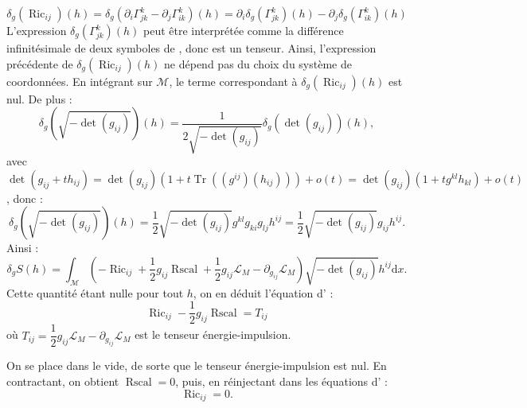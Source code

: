 \documentclass[12pt,a4paper]{article}
\DeclareMathOperator{\Tr}{Tr}
\DeclareMathOperator{\Ric}{Ric}
\DeclareMathOperator{\Rscal}{Rscal}
\theoremstyle{definition}
\begin{document}
$$
\delta_g\left(\Ric_{ij}\right)(h)=\delta_g\left(\partial_i\Gamma^k_{jk}-\partial_j\Gamma^k_{ik}\right)(h)=\partial_i\delta_g\left(\Gamma^k_{jk}\right)(h)-\partial_j\delta_g\left(\Gamma^k_{ik}\right)(h)
$$
L'expression $\delta_g\left(\Gamma_{jk}^k\right)(h)$ peut être interprétée comme la différence infinitésimale de deux symboles de , donc est un tenseur. Ainsi, l'expression précédente de $\delta_g\left(\Ric_{ij}\right)(h)$ ne dépend pas du choix du système de coordonnées.\newline
En intégrant sur $\mathcal{M}$, le terme correspondant à $\delta_g(\Ric_{ij})(h)$ est nul.
\newpage
De plus : 
$$
\delta_g\left(\sqrt{-\det(g_{ij})}\right)(h)=\dfrac{1}{2\sqrt{-\det(g_{ij})}}\delta_g\left(\det(g_{ij})\right)(h),
$$
avec $\det(g_{ij}+th_{ij})=\det(g_{ij})(1+t\Tr((g^{ij})(h_{ij})))+o(t)=\det(g_{ij})(1+tg^{kl}h_{kl})+o(t)$, donc :
$$
\delta_g\left(\sqrt{-\det(g_{ij})}\right)(h)=\dfrac{1}{2}\sqrt{-\det(g_{ij})}g^{kl}g_{ki}g_{lj}h^{ij}=\dfrac{1}{2}\sqrt{-\det(g_{ij})}g_{ij}h^{ij}.
$$
Ainsi :
$$
\delta_gS(h)=\int_\mathcal{M}\left(-\Ric_{ij}+\dfrac{1}{2}g_{ij}\Rscal+\dfrac{1}{2}g_{ij}\mathcal{L}_M-\partial_{g_{ij}}\mathcal{L}_M\right)\sqrt{-\det(g_{ij})}h^{ij}\mathrm{d}x.
$$
Cette quantité étant nulle pour tout $h$, on en déduit l'équation d' :
$$
\Ric_{ij}-\dfrac{1}{2}g_{ij}\Rscal=T_{ij}
$$
où $T_{ij}=\dfrac{1}{2}g_{ij}\mathcal{L}_M-\partial_{g_{ij}}\mathcal{L}_M$ est le tenseur énergie-impulsion.

\medskip

On se place dans le vide, de sorte que le tenseur énergie-impulsion est nul. En contractant, on obtient $\Rscal=0$, puis, en réinjectant dans les équations d' :$$\Ric_{ij}=0.$$
\end{document}
